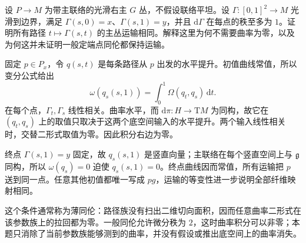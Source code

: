 \begin{exercise}\label{g1:ex:thin-homotopy-principal-transport}
	设 \(P\to M\) 为带主联络的光滑右主 \(G\) 丛，不假设联络平坦。设 \(\Gamma:[0,1]^2\to M\) 光滑到边界，满足 \(\Gamma(s,0)=x\)、\(\Gamma(s,1)=y\)，并且 \(\mathrm{d}\Gamma\) 在每点的秩至多为 \(1\)。证明所有路径 \(t\mapsto\Gamma(s,t)\) 的主丛运输相同。解释这里为何不需要曲率为零，以及为何这并未证明一般定端点同伦都保持运输。
\end{exercise}
\begin{solution}
	固定 \(p\in P_x\)，令 \(q(s,t)\) 是每条路径从 \(p\) 出发的水平提升。初值曲线常值，所以变分公式给出
	\[
		\omega(q_s(s,1))=\int_0^1\Omega(q_t,q_s)\,\mathrm{d}t.
	\]
	在每个点，\(\Gamma_t,\Gamma_s\) 线性相关。曲率水平，而 \(\mathrm{d}\pi:H\to \mathrm{T}M\) 为同构，故它在 \((q_t,q_s)\) 上的取值只取决于这两个底空间输入的水平提升。两个输入线性相关时，交替二形式取值为零。因此积分右边为零。

	终点 \(\Gamma(s,1)=y\) 固定，故 \(q_s(s,1)\) 是竖直向量；主联络在每个竖直空间上与 \(\mathfrak g\) 同构，所以 \(\omega(q_s)=0\) 迫使 \(q_s(s,1)=0\)。终点曲线因而常值，所有运输把 \(p\) 送到同一点。任意其他初值都唯一写成 \(p g\)，运输的等变性进一步说明全部纤维映射相同。

	这个条件通常称为薄同伦：路径族没有扫出二维切向面积，因而任意曲率二形式在该参数族上的拉回都为零。一般同伦允许微分秩为 \(2\)，这时曲率积分可以非零；本题只消除了当前参数族能够测到的曲率，并没有假设或推出底空间上的曲率消失。
\end{solution}

